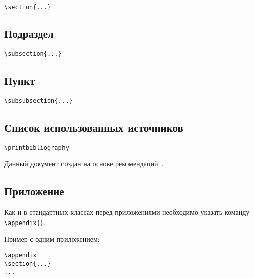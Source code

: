 \documentclass[14pt, a4paper, titlepage]{extarticle}
\renewcommand{\thesection}{\Asbuk{section}}
\let\oldsec\section
\renewcommand{\section}{
        \clearpage
        \phantomsection
        \refstepcounter{section}
        \addcontentsline{toc}{section}{\appendixname~\thesection}
        \oldsec*} %
\let\oldprintbibliography\printbibliography
\renewcommand{\printbibliography}{\oldprintbibliography[title={Список использованных источников}]}
\begin{document}
\begin{verbatim}
\section{...}
\end{verbatim}

\subsection{Подраздел}

\begin{verbatim}
\subsection{...}
\end{verbatim}

\subsection{Пункт}

\begin{verbatim}
\subsubsection{...}
\end{verbatim}

\subsection{Список использованных источников}

\begin{verbatim}
\printbibliography
\end{verbatim}

Данный документ создан на основе рекомендаций~\parencite{bib:recomendations}.

\subsection{Приложение}

Как и в стандартных классах перед приложениями необходимо указать команду \verb"\appendix{}".

Пример с одним приложением:

\begin{verbatim}
\appendix
\section{...}
...
\end{verbatim}
\end{document}
